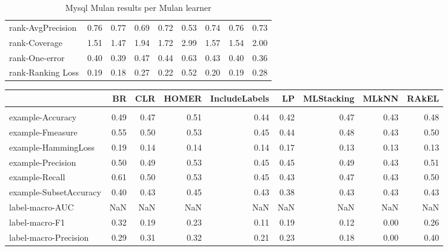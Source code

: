 \documentclass{acm_proc_article-sp}
\begin{document}
\begin{table}
\begin{tabular}{l|rrrrrrrr}
rank-AvgPrecision & 0.76 & 0.77 & 0.69 & 0.72 & 0.53 & 0.74 & 0.76 & 0.73 \\

rank-Coverage & 1.51 & 1.47 & 1.94 & 1.72 & 2.99 & 1.57 & 1.54 & 2.00 \\

rank-One-error & 0.40 & 0.39 & 0.47 & 0.44 & 0.63 & 0.43 & 0.40 & 0.36 \\

rank-Ranking Loss & 0.19 & 0.18 & 0.27 & 0.22 & 0.52 & 0.20 & 0.19 & 0.28 \\

\end{tabular}
\caption{Mysql Mulan results per Mulan learner}
\end{table}


\begin{table}
\centering
\begin{tabular}{l|rrrrrrrr}

  & BR & CLR & HOMER & IncludeLabels & LP & MLStacking & MLkNN & RAkEL \\

\hline \\

example-Accuracy & 0.49 & 0.47 & 0.51 & 0.44 & 0.42 & 0.47 & 0.43 & 0.48 \\

example-Fmeasure & 0.55 & 0.50 & 0.53 & 0.45 & 0.44 & 0.48 & 0.43 & 0.50 \\

example-HammingLoss & 0.19 & 0.14 & 0.14 & 0.14 & 0.17 & 0.13 & 0.13 & 0.13 \\

example-Precision & 0.50 & 0.49 & 0.53 & 0.45 & 0.45 & 0.49 & 0.43 & 0.51 \\

example-Recall & 0.61 & 0.50 & 0.53 & 0.45 & 0.43 & 0.47 & 0.43 & 0.50 \\

example-SubsetAccuracy & 0.40 & 0.43 & 0.45 & 0.43 & 0.38 & 0.43 & 0.43 & 0.43 \\

label-macro-AUC & NaN & NaN & NaN & NaN & NaN & NaN & NaN & NaN \\

label-macro-F1 & 0.32 & 0.19 & 0.23 & 0.11 & 0.19 & 0.12 & 0.00 & 0.26 \\

label-macro-Precision & 0.29 & 0.31 & 0.32 & 0.21 & 0.23 & 0.18 & 0.00 & 0.40 \\


\end{tabular}
\end{table}
\end{document}
